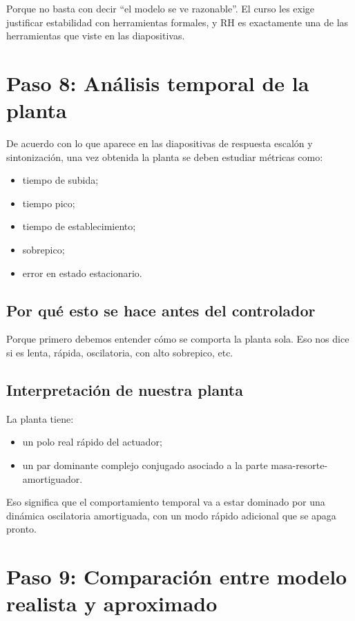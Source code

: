 \documentclass[11pt]{article}
\begin{document}
Porque no basta con decir ``el modelo se ve razonable''. El curso les exige justificar estabilidad con herramientas formales, y RH es exactamente una de las herramientas que viste en las diapositivas.

\section{Paso 8: An\'alisis temporal de la planta}

De acuerdo con lo que aparece en las diapositivas de respuesta escal\'on y sintonizaci\'on, una vez obtenida la planta se deben estudiar m\'etricas como:

\begin{itemize}[leftmargin=1.2cm]
\item tiempo de subida;
\item tiempo pico;
\item tiempo de establecimiento;
\item sobrepico;
\item error en estado estacionario.
\end{itemize}

\subsection{Por qu\'e esto se hace antes del controlador}

Porque primero debemos entender c\'omo se comporta la planta sola. Eso nos dice si es lenta, r\'apida, oscilatoria, con alto sobrepico, etc.

\subsection{Interpretaci\'on de nuestra planta}

La planta tiene:

\begin{itemize}[leftmargin=1.2cm]
\item un polo real r\'apido del actuador;
\item un par dominante complejo conjugado asociado a la parte masa-resorte-amortiguador.
\end{itemize}

Eso significa que el comportamiento temporal va a estar dominado por una din\'amica oscilatoria amortiguada, con un modo r\'apido adicional que se apaga pronto.

\section{Paso 9: Comparaci\'on entre modelo realista y aproximado}
\end{document}
